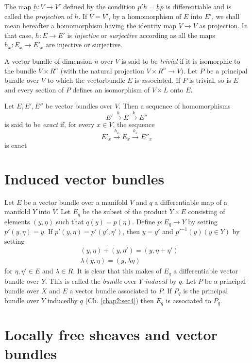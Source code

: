 The map $\underbar{h}: V \to V'$ defined by the condition $p'h =
\underbar{h} p $ is differentiable and is called the \textit{
  projection } of $h$. If $V =V'$, by a homomorphism of $E$ into $E'$,
we shall mean hereafter a homomorphism having the identity map $V \to
V$ as projection. In that case, $h :E \to E'$ is \textit{ injective }
or \textit{ surjective} according as all the maps $h_x : E_x \to E'_x$
are injective or surjective.    

A vector bundle of dimension $n$ over $V$ is said to be \textit{
  trivial } if it is isomorphic to the bundle $V \times R^n$ (with the
natural projection $V \times R^n \to V)$. Let $P$ be a principal
bundle over $V$ to which the vector\pageoriginale bundle $E$ is associated. If $P$
is trivial, so is $E$ and every section of $P$ defines an isomorphism
of $V \times L$ onto $E$. 

Let $E, E' , E''$ be vector bundles over $V$. Then a sequence of homomorphisms 
$$
E' \xrightarrow{h} E  \xrightarrow{k} E''
$$
is said to be \textit{ exact } if, for every $x \in V$, the sequence  
$$
E'_x \xrightarrow{h_x} E_x \xrightarrow{k_x} E''_x
$$
is exact 

\section{Induced vector bundles}\label{chap5:sec3}%

Let $E$ be a vector bundle over a manifold $V$ and $q$ a
differentiable map of a manifold $Y$ into $V$. Let $E_q$ be the subset
of the product $Y \times E$ consisting of elements $(y, \eta)$ such
that $q(y) = p(\eta)$. 
Define $p :E_q \to Y$ by setting $p'(y, \eta) =y$. If $p' (y, \eta) =
p'(y', \eta')$, then $y = y'$ and $p'^{-1} (y) (y \in Y)$ by setting 
\begin{align*}
  & (y,\eta ) + (y, \eta') = (y, \eta + \eta')\\
  & \lambda (y, \eta) = (y , \lambda \eta)
\end{align*}
for $\eta, \eta' \in E$ and $\lambda \in R$. It is clear that this
makes of $E_q$ a differentiable vector bundle over $Y$. This is
called the \textit{ bundle } over $Y$ \textit{induced} by $q$. Let $P$
be a principal bundle over $X$ and $E$ a vector bundle associated to
$P$. If $P_q$ is the principal bundle over $Y$ induced\pageoriginale by
$q$ (Ch. \ref{chap2:sec4}) then $E_q$ is associated to $P_q$. 

\section{Locally free sheaves and vector bundles}\label{chap5:sec4}%

